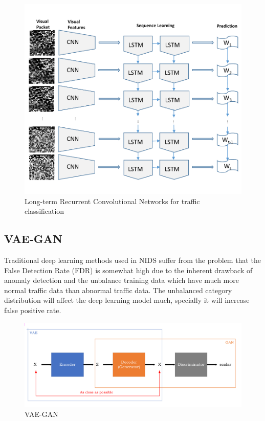 \documentclass[conference]{IEEEtran}
\begin{document}
\begin{figure}[ht]
  \centering
  \includegraphics[scale=0.48]{pictures/framework.pdf}
  \caption{Long-term Recurrent Convolutional Networks for traffic classification}
  \label{fig:framework}
  \end{figure}



\subsection{VAE-GAN}
Traditional deep learning methods used in NIDS suffer from the problem that the False Detection Rate (FDR) is somewhat high due to the inherent drawback of anomaly detection and the unbalance training data which have much more normal traffic data than abnormal traffic data. The unbalanced category distribution will affect the deep learning model much, specially it will increase false positive rate.


\begin{figure}[ht]
  \centering
  \includegraphics[scale=0.34]{pictures/VAE-GAN.pdf}
  \caption{VAE-GAN}
  \label{fig:vaegan}
  \end{figure}
\end{document}
